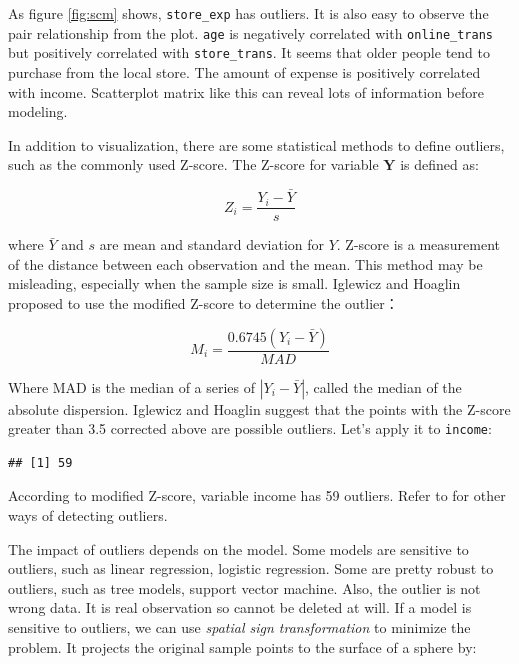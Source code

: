 \documentclass[12pt,]{krantz}
\newenvironment{Shaded}{\begin{snugshade}}{\end{snugshade}}
\newcommand{\KeywordTok}[1]{\textcolor[rgb]{0.13,0.29,0.53}{\textbf{{#1}}}}
\newcommand{\FloatTok}[1]{\textcolor[rgb]{0.00,0.00,0.81}{{#1}}}
\newcommand{\CommentTok}[1]{\textcolor[rgb]{0.56,0.35,0.01}{\textit{{#1}}}}
\newcommand{\NormalTok}[1]{{#1}}
\theoremstyle{definition}
\theoremstyle{definition}
\theoremstyle{remark}
\begin{document}
As figure \ref{fig:scm} shows, \texttt{store\_exp} has outliers. It is
also easy to observe the pair relationship from the plot. \texttt{age}
is negatively correlated with \texttt{online\_trans} but positively
correlated with \texttt{store\_trans}. It seems that older people tend
to purchase from the local store. The amount of expense is positively
correlated with income. Scatterplot matrix like this can reveal lots of
information before modeling.

In addition to visualization, there are some statistical methods to
define outliers, such as the commonly used Z-score. The Z-score for
variable \(\mathbf{Y}\) is defined as:

\[Z_{i}=\frac{Y_{i}-\bar{Y}}{s}\]

where \(\bar{Y}\) and \(s\) are mean and standard deviation for \(Y\).
Z-score is a measurement of the distance between each observation and
the mean. This method may be misleading, especially when the sample size
is small. Iglewicz and Hoaglin proposed to use the modified Z-score to
determine the outlier\citep{mad1}：

\[M_{i}=\frac{0.6745(Y_{i}-\bar{Y})}{MAD}\]

Where MAD is the median of a series of \(|Y_ {i} - \bar{Y}|\), called
the median of the absolute dispersion. Iglewicz and Hoaglin suggest that
the points with the Z-score greater than 3.5 corrected above are
possible outliers. Let's apply it to \texttt{income}:

\begin{Shaded}
\end{Shaded}

\begin{verbatim}
## [1] 59
\end{verbatim}

According to modified Z-score, variable income has 59 outliers. Refer to
\citep{mad1} for other ways of detecting outliers.

The impact of outliers depends on the model. Some models are sensitive
to outliers, such as linear regression, logistic regression. Some are
pretty robust to outliers, such as tree models, support vector machine.
Also, the outlier is not wrong data. It is real observation so cannot be
deleted at will. If a model is sensitive to outliers, we can use
\emph{spatial sign transformation} \citep{ssp} to minimize the problem.
It projects the original sample points to the surface of a sphere by:
\end{document}
